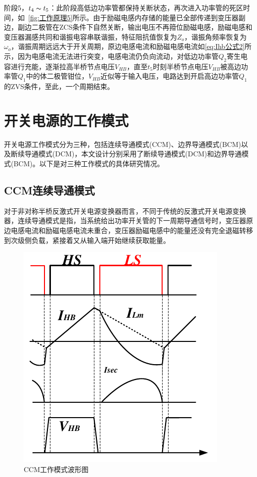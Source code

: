 阶段5，$t_4 \thicksim t_5$：此阶段高低边功率管都保持关断状态，再次进入功率管的死区时间，如~\ref{fig:工作原理5}所示。由于励磁电感内存储的能量已全部传递到变压器副边，副边二极管在ZCS条件下自然关断，输出电压不再箝位励磁电感，励磁电感和变压器漏感共同和谐振电容串联谐振，特征阻抗值恢复为$Z_o$，谐振角频率恢复为$\omega_o$，谐振周期远远大于开关周期，原边电感电流和励磁电感电流如\eqref{eq:Ihb公式2}所示，因为电感电流无法进行突变，电感电流仍负向流动，对低边功率管$Q_2$寄生电容进行充能，逐渐拉高半桥节点电压$V_{HB}$，直至$t_5$时刻半桥节点电压$V_{HB}$被高边功率管$Q_1$中的体二极管钳位，$V_{HB}$近似等于输入电压，电路达到开启高边功率管$Q_1$的ZVS条件，至此，一个周期结束。

								



\section{开关电源的工作模式}
\label{sec:dataset-build}

开关电源工作模式分为三种，包括连续导通模式(CCM)、边界导通模式(BCM)以及断续导通模式(DCM)，本文设计分别采用了断续导通模式(DCM)和边界导通模式(BCM)。以下是对三种工作模式的具体研究情况。

\subsection{CCM连续导通模式}
对于非对称半桥反激式开关电源变换器而言，不同于传统的反激式开关电源变换器，连续导通模式是指，当系统给出功率开关管的下一周期导通信号时，变压器原边电感电流和励磁电感电流未重合，变压器励磁电感中的能量还没有完全退磁转移到次级侧负载，紧接着又从输入端开始继续获取能量。

\begin{figure}[htbp] 
    \centering
    \includegraphics[width=0.8\linewidth]{figures/CCM模式.pdf}
    \caption{CCM工作模式波形图}
    \label{fig:CCM工作模式波形图}
\end{figure}

